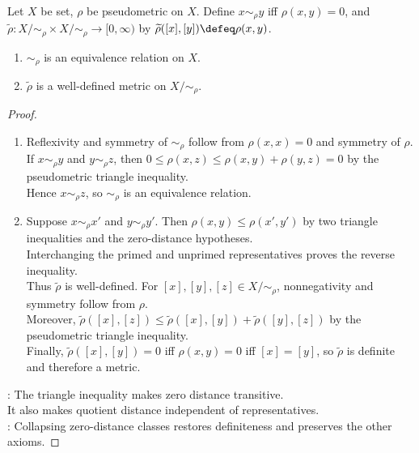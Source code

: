\begin{proposition} \label{prop:pseudometric-metric-quotient} \\
Let $X$ be set, $\rho$ be pseudometric on $X$. Define $x\sim_\rho y$ iff $\rho(x,y)=0$, and $\widetilde{\rho}:X/{\sim_\rho}\times X/{\sim_\rho}\to[0,\infty)$ by $\widetilde{\rho}([x],[y])\defeq\rho(x,y)$.
\begin{enumerate}[label=(\roman*)]
\setlength{\itemsep}{0pt}
\item $\sim_\rho$ is an equivalence relation on $X$.
\item $\widetilde{\rho}$ is a well-defined metric on $X/{\sim_\rho}$.
\end{enumerate}
\begin{proof}
\begin{enumerate}[label=(\roman*)]
\setlength{\itemsep}{0pt}
\item Reflexivity and symmetry of $\sim_\rho$ follow from $\rho(x,x)=0$ and symmetry of $\rho$.\\
If $x\sim_\rho y$ and $y\sim_\rho z$, then $0\leq\rho(x,z)\leq\rho(x,y)+\rho(y,z)=0$ by the pseudometric triangle inequality.\\
Hence $x\sim_\rho z$, so $\sim_\rho$ is an equivalence relation.
\item Suppose $x\sim_\rho x'$ and $y\sim_\rho y'$. Then $\rho(x,y)\leq\rho(x',y')$ by two triangle inequalities and the zero-distance hypotheses.\\
Interchanging the primed and unprimed representatives proves the reverse inequality.\\
Thus $\widetilde{\rho}$ is well-defined. For $[x],[y],[z]\in X/{\sim_\rho}$, nonnegativity and symmetry follow from $\rho$.\\
Moreover, $\widetilde{\rho}([x],[z])\leq\widetilde{\rho}([x],[y])+\widetilde{\rho}([y],[z])$ by the pseudometric triangle inequality.\\
Finally, $\widetilde{\rho}([x],[y])=0$ iff $\rho(x,y)=0$ iff $[x]=[y]$, so $\widetilde{\rho}$ is definite and therefore a metric.
\end{enumerate}
: The triangle inequality makes zero distance transitive.\\
It also makes quotient distance independent of representatives.\\
: Collapsing zero-distance classes restores definiteness and preserves the other axioms.
\end{proof}
\end{proposition}

